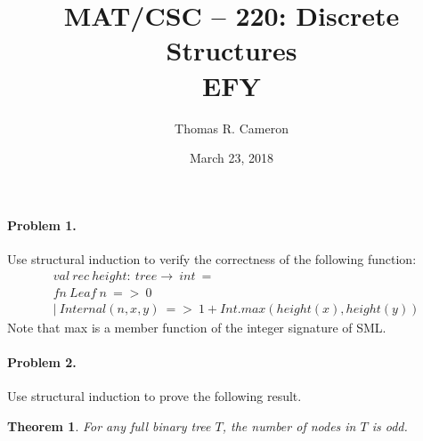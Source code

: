 \documentclass{article}
\title{MAT/CSC -- 220: Discrete Structures\\
\large{EFY}}
\author{Thomas R. Cameron}
\date{March 23, 2018}
\newtheorem*{theorem}{Theorem}
\begin{document}
\maketitle

\paragraph*{Problem 1.} Use structural induction to verify the correctness of the following function:
\begin{align*}
&val~rec~height\colon~tree\rightarrow~int~=\\
&fn~Leaf~n~=>~0 \\
&|~Internal(n,x,y)~=>~1+Int.max(height(x),height(y))
\end{align*}
Note that max is a member function of the integer signature of SML. 

\paragraph*{Problem 2.} Use structural induction to prove the following result.

\begin{theorem}
For any full binary tree $T$, the number of nodes in $T$ is odd. 
\end{theorem}
\end{document}
